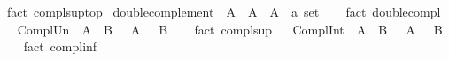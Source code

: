 \begin{isabellebody}
%
\isatagproof
{}\isamarkupfalse%
\ {\isacharparenleft}{\kern0pt}fact\ compl{\isacharunderscore}{\kern0pt}sup{\isacharunderscore}{\kern0pt}top{\isacharparenright}{\kern0pt}%
\endisatagproof
{\isafoldproof}%
%
\isadelimproof
\isanewline
%
\endisadelimproof
\isanewline
{}\isamarkupfalse%
\ double{\isacharunderscore}{\kern0pt}complement{\isacharcolon}{\kern0pt}\ {\isachardoublequoteopen}{\isacharminus}{\kern0pt}\ {\isacharparenleft}{\kern0pt}{\isacharminus}{\kern0pt}A{\isacharparenright}{\kern0pt}\ {\isacharequal}{\kern0pt}\ A{\isachardoublequoteclose}\ \ A\ {\isacharcolon}{\kern0pt}{\isacharcolon}{\kern0pt}\ {\isachardoublequoteopen}{\isacharprime}{\kern0pt}a\ set{\isachardoublequoteclose}\isanewline
%
\isadelimproof
\ \ %
\endisadelimproof
%
\isatagproof
{}\isamarkupfalse%
\ {\isacharparenleft}{\kern0pt}fact\ double{\isacharunderscore}{\kern0pt}compl{\isacharparenright}{\kern0pt}%
\endisatagproof
{\isafoldproof}%
%
\isadelimproof
%
\endisadelimproof
\ \isanewline
\isanewline
{}\isamarkupfalse%
\ Compl{\isacharunderscore}{\kern0pt}Un{\isacharcolon}{\kern0pt}\ {\isachardoublequoteopen}{\isacharminus}{\kern0pt}\ {\isacharparenleft}{\kern0pt}A\ {\isasymunion}\ B{\isacharparenright}{\kern0pt}\ {\isacharequal}{\kern0pt}\ {\isacharparenleft}{\kern0pt}{\isacharminus}{\kern0pt}\ A{\isacharparenright}{\kern0pt}\ {\isasyminter}\ {\isacharparenleft}{\kern0pt}{\isacharminus}{\kern0pt}\ B{\isacharparenright}{\kern0pt}{\isachardoublequoteclose}\isanewline
%
\isadelimproof
\ \ %
\endisadelimproof
%
\isatagproof
{}\isamarkupfalse%
\ {\isacharparenleft}{\kern0pt}fact\ compl{\isacharunderscore}{\kern0pt}sup{\isacharparenright}{\kern0pt}%
\endisatagproof
{\isafoldproof}%
%
\isadelimproof
%
\endisadelimproof
\ \isanewline
\isanewline
{}\isamarkupfalse%
\ Compl{\isacharunderscore}{\kern0pt}Int{\isacharcolon}{\kern0pt}\ {\isachardoublequoteopen}{\isacharminus}{\kern0pt}\ {\isacharparenleft}{\kern0pt}A\ {\isasyminter}\ B{\isacharparenright}{\kern0pt}\ {\isacharequal}{\kern0pt}\ {\isacharparenleft}{\kern0pt}{\isacharminus}{\kern0pt}\ A{\isacharparenright}{\kern0pt}\ {\isasymunion}\ {\isacharparenleft}{\kern0pt}{\isacharminus}{\kern0pt}\ B{\isacharparenright}{\kern0pt}{\isachardoublequoteclose}\isanewline
%
\isadelimproof
\ \ %
\endisadelimproof
%
\isatagproof
{}\isamarkupfalse%
\ {\isacharparenleft}{\kern0pt}fact\ compl{\isacharunderscore}{\kern0pt}inf{\isacharparenright}{\kern0pt}%
\endisatagproof
{\isafoldproof}%
%
\isadelimproof
%
\endisadelimproof
\ \isanewline

\end{isabellebody}
